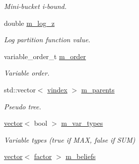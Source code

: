 \begin{DoxyCompactItemize}
\begin{DoxyCompactList}\small\item\em Mini-\/bucket i-\/bound. \end{DoxyCompactList}\item 
double \hyperlink{classmerlin_1_1wmb_ac0e420613dd6b983ade039b5c0951bf2}{m\+\_\+log\+\_\+z}\hypertarget{classmerlin_1_1wmb_ac0e420613dd6b983ade039b5c0951bf2}{}\label{classmerlin_1_1wmb_ac0e420613dd6b983ade039b5c0951bf2}

\begin{DoxyCompactList}\small\item\em Log partition function value. \end{DoxyCompactList}\item 
variable\+\_\+order\+\_\+t \hyperlink{classmerlin_1_1wmb_a90dcccb0c36b950773488d6571f63794}{m\+\_\+order}\hypertarget{classmerlin_1_1wmb_a90dcccb0c36b950773488d6571f63794}{}\label{classmerlin_1_1wmb_a90dcccb0c36b950773488d6571f63794}

\begin{DoxyCompactList}\small\item\em Variable order. \end{DoxyCompactList}\item 
std\+::vector$<$ \hyperlink{classmerlin_1_1wmb_ab942720d1c65e0002674af4eeade660f}{vindex} $>$ \hyperlink{classmerlin_1_1wmb_a5f61b40f731ee4bdd5925573dccb0d67}{m\+\_\+parents}\hypertarget{classmerlin_1_1wmb_a5f61b40f731ee4bdd5925573dccb0d67}{}\label{classmerlin_1_1wmb_a5f61b40f731ee4bdd5925573dccb0d67}

\begin{DoxyCompactList}\small\item\em Pseudo tree. \end{DoxyCompactList}\item 
\hyperlink{classmerlin_1_1vector}{vector}$<$ bool $>$ \hyperlink{classmerlin_1_1wmb_a3168b866bd967a777a37d5e48a360452}{m\+\_\+var\+\_\+types}\hypertarget{classmerlin_1_1wmb_a3168b866bd967a777a37d5e48a360452}{}\label{classmerlin_1_1wmb_a3168b866bd967a777a37d5e48a360452}

\begin{DoxyCompactList}\small\item\em Variable types (true if M\+AX, false if S\+UM) \end{DoxyCompactList}\item 
\hyperlink{classmerlin_1_1vector}{vector}$<$ \hyperlink{classmerlin_1_1factor}{factor} $>$ \hyperlink{classmerlin_1_1wmb_a0ddbaa2a79b9d8b06f58b9f476250fd2}{m\+\_\+beliefs}\hypertarget{classmerlin_1_1wmb_a0ddbaa2a79b9d8b06f58b9f476250fd2}{}\label{classmerlin_1_1wmb_a0ddbaa2a79b9d8b06f58b9f476250fd2}


\end{DoxyCompactItemize}
